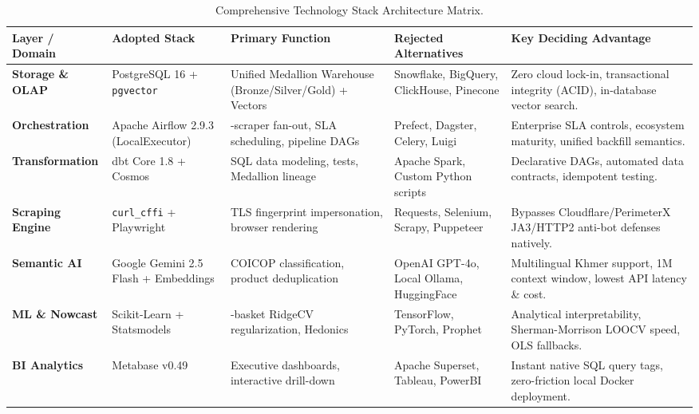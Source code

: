 \documentclass[a4paper, 11pt]{article}
\begin{document}
\begin{table}[H]
\centering
\footnotesize
\setlength{\tabcolsep}{4pt}
\begin{tabularx}{\textwidth}{@{}l >{\raggedright\arraybackslash}p{2.6cm} >{\raggedright\arraybackslash}p{3.1cm} >{\raggedright\arraybackslash}p{2.9cm} >{\raggedright\arraybackslash}X@{}}
\toprule
\textbf{Layer / Domain} & \textbf{Adopted Stack} & \textbf{Primary Function} & \textbf{Rejected Alternatives} & \textbf{Key Deciding Advantage} \\
\midrule
\textbf{Storage \& OLAP} & PostgreSQL 16 + \texttt{pgvector} & Unified Medallion Warehouse (Bronze/Silver/Gold) + Vectors & Snowflake, BigQuery, ClickHouse, Pinecone & Zero cloud lock-in, transactional integrity (ACID), in-database vector search. \\
\addlinespace[2pt]
\textbf{Orchestration} & Apache Airflow 2.9.3 (LocalExecutor) & 25-scraper fan-out, SLA scheduling, pipeline DAGs & Prefect, Dagster, Celery, Luigi & Enterprise SLA controls, ecosystem maturity, unified backfill semantics. \\
\addlinespace[2pt]
\textbf{Transformation} & dbt Core 1.8 + Cosmos & SQL data modeling, tests, Medallion lineage & Apache Spark, Custom Python scripts & Declarative DAGs, automated data contracts, idempotent testing. \\
\addlinespace[2pt]
\textbf{Scraping Engine} & \texttt{curl\_cffi} + Playwright & TLS fingerprint impersonation, browser rendering & Requests, Selenium, Scrapy, Puppeteer & Bypasses Cloudflare/PerimeterX JA3/HTTP2 anti-bot defenses natively. \\
\addlinespace[2pt]
\textbf{Semantic AI} & Google Gemini 2.5 Flash + Embeddings & COICOP classification, product deduplication & OpenAI GPT-4o, Local Ollama, HuggingFace & Multilingual Khmer support, 1M context window, lowest API latency \& cost. \\
\addlinespace[2pt]
\textbf{ML \& Nowcast} & Scikit-Learn + Statsmodels & 5-basket RidgeCV regularization, Hedonics & TensorFlow, PyTorch, Prophet & Analytical interpretability, Sherman-Morrison LOOCV speed, OLS fallbacks. \\
\addlinespace[2pt]
\textbf{BI Analytics} & Metabase v0.49 & Executive dashboards, interactive drill-down & Apache Superset, Tableau, PowerBI & Instant native SQL query tags, zero-friction local Docker deployment. \\
\bottomrule
\end{tabularx}
\caption{Comprehensive Technology Stack Architecture Matrix.}
\end{table}
\end{document}
